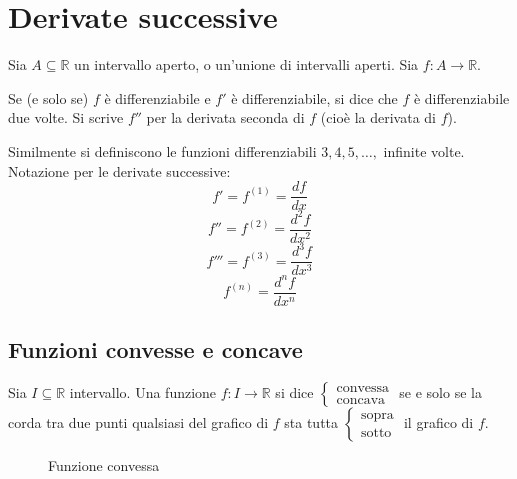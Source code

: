 \documentclass[a4paper]{article}
\theoremstyle{break}
\theoremstyle{break}
\theoremstyle{break}
\theoremstyle{break}
\begin{document}
\section{Derivate successive}
Sia \( A \subseteq \mathbb{R} \) un intervallo aperto, o un'unione di intervalli aperti.
Sia \( f: A \to \mathbb{R} \).

Se (e solo se) \( f \) è differenziabile e \( f' \) è differenziabile, si dice
che \( f \) è differenziabile due volte. Si scrive \( f'' \) per la derivata seconda di
\( f \) (cioè la derivata di \( f \)).

Similmente si definiscono le funzioni differenziabili \( 3,4,5, \ldots, \) infinite volte.
Notazione per le derivate successive:
\[
  f' = f^{(1)} = \frac{df}{dx}
\] 
\[
  f'' = f^{(2)} = \frac{d^2f}{dx^2}
\] 
\[
  f''' = f^{(3)} = \frac{d^3f}{dx^3}
\] 
\[
  f^{(n)} = \frac{d^nf}{dx^n}
\] 
\subsection{Funzioni convesse e concave}
Sia \( I \subseteq \mathbb{R} \) intervallo. Una funzione \( f: I \to \mathbb{R} \)
si dice \( \begin{cases}
  \text{convessa}\\
  \text{concava}
\end{cases} \) se e solo se la corda tra due punti qualsiasi del grafico di \( f \) sta
tutta \( \begin{cases}
  \text{sopra}\\
  \text{sotto}
\end{cases} \) il grafico di \( f \). 
\begin{figure}[H]
  \centering
  \caption{Funzione convessa}
\end{figure}
\end{document}

